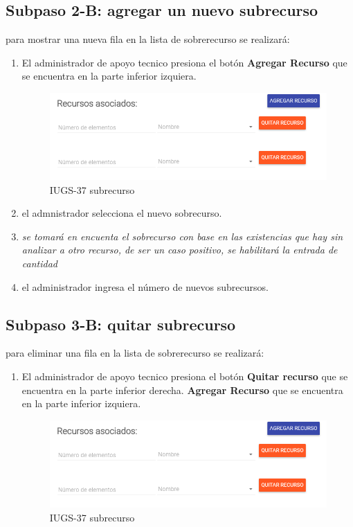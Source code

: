 \subsection{Subpaso 2-B: agregar un nuevo subrecurso}
	para mostrar una nueva fila en la lista de sobrerecurso se realizará:	
	\begin{enumerate}
		\item El administrador de apoyo tecnico presiona el botón 
			\textbf{Agregar Recurso} que se encuentra en la parte inferior izquiera. \par
			\begin{figure}[hbtp]	
				\centering
					\includegraphics[scale=0.3]{images/Interfaz/IUGS37_Subrecurso.png}
					\caption{IUGS-37 subrecurso}
			\end{figure}
		\item el admnistrador selecciona el nuevo sobrecurso.
		\item \textit{se tomará en encuenta el sobrecurso con base en
			las existencias que hay sin analizar a otro recurso, de ser
			un caso positivo, se habilitará la entrada de cantidad}
		\item  el administrador ingresa el número de nuevos subrecursos.
		
	\end{enumerate}		
	
	
\subsection{Subpaso 3-B: quitar subrecurso}
	para eliminar una fila en la lista de sobrerecurso se realizará:	
	\begin{enumerate}
		\item El administrador de apoyo tecnico presiona el botón 
			\textbf{Quitar recurso} que se encuentra en la parte inferior derecha.
			\textbf{Agregar Recurso} que se encuentra en la parte inferior izquiera. \par
			\begin{figure}[hbtp]	
				\centering
					\includegraphics[scale=0.3]{images/Interfaz/IUGS37_Subrecurso.png}
					\caption{IUGS-37 subrecurso}
			\end{figure}
	\end{enumerate}		



